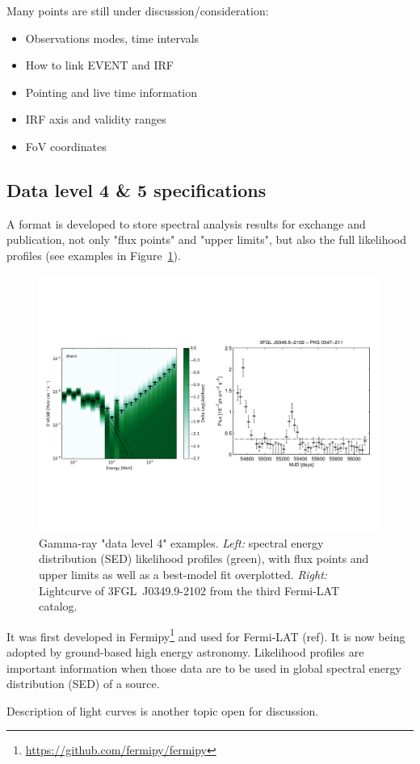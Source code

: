 Many points are still under discussion/consideration:

\begin{itemize}
\item{}Observations modes, time intervals
\item{}How to link EVENT and IRF
\item{}Pointing and live time information
\item{}IRF axis and validity ranges
\item{}FoV coordinates
\end{itemize}

\subsection{Data level 4 \& 5 specifications}

A format is developed to store spectral analysis results for exchange and publication, not only "flux points" and "upper limits", but also the full likelihood profiles (see examples in Figure~\ref{fig:dl4-examples}).

\begin{figure}[tb]
\centerline{\includegraphics[width=\textwidth]{figures/dl4-examples}}
\caption{
Gamma-ray "data level 4" examples. \emph{Left:} spectral energy distribution (SED) likelihood profiles (green), with flux points and upper limits as well
as a best-model fit overplotted. \emph{Right:} Lightcurve of 3FGL~J0349.9-2102 from the third Fermi-LAT catalog.
}
\label{fig:dl4-examples}
\end{figure}

It was first developed in Fermipy\footnote{\url{https://github.com/fermipy/fermipy}} and used for Fermi-LAT (ref). It is now being adopted by ground-based high energy astronomy. Likelihood profiles are important information when those data are to be used in global spectral energy distribution (SED) of a source. 

Description of light curves is another topic open for discussion. 
